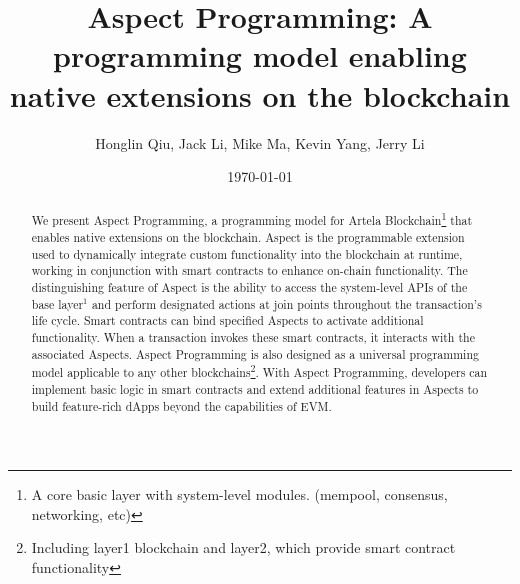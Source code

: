 \documentclass{article}
\begin{document}
\title{Aspect Programming: A programming model enabling native extensions on the blockchain}
\author{Honglin Qiu, Jack Li, Mike Ma, Kevin Yang, Jerry Li}
\date{\today}


\maketitle

\begin{abstract}
    We present Aspect Programming, a programming model for Artela Blockchain\footnote{A core basic layer with system-level modules. (mempool, consensus, networking, etc)} that enables native extensions on the blockchain. Aspect is the programmable extension used to dynamically integrate custom functionality into the blockchain at runtime, working in conjunction with smart contracts to enhance on-chain functionality. The distinguishing feature of Aspect is the ability to access the system-level APIs of the base layer$^1$ and perform designated actions at join points throughout the transaction's life cycle. Smart contracts can bind specified Aspects to activate additional functionality. When a transaction invokes these smart contracts, it interacts with the associated Aspects. Aspect Programming is also designed as a universal programming model applicable to any other blockchains\footnote{Including layer1 blockchain and layer2, which provide smart contract functionality}. With Aspect Programming, developers can implement basic logic in smart contracts and extend additional features in Aspects to build feature-rich dApps beyond the capabilities of EVM.
\end{abstract}

\newpage
\tableofcontents
\newpage









\newpage




\end{document}
